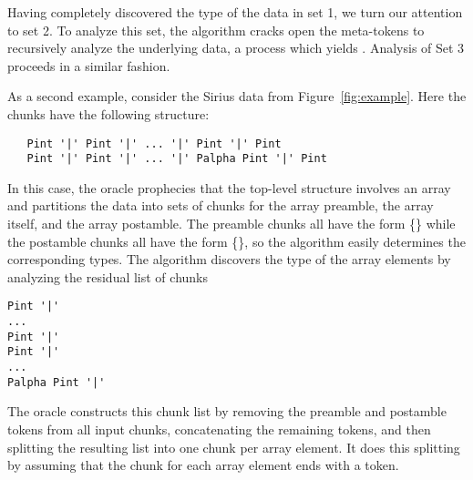 Having completely discovered the type of the data in set 1, we turn
our attention to set 2. 
To analyze this set, the algorithm cracks open the \cd{[*]} meta-tokens
to recursively analyze the underlying data, a process which yields 
. Analysis of Set 3 proceeds in a similar 
fashion.


As a second example, consider the Sirius data from Figure~\ref{fig:example}.
Here the chunks have the following structure:

{\small
\begin{verbatim}
   Pint '|' Pint '|' ... '|' Pint '|' Pint
   Pint '|' Pint '|' ... '|' Palpha Pint '|' Pint
\end{verbatim}
}%

\noindent
In this case, the oracle prophecies that the top-level structure involves
an array and partitions the data into sets of chunks for the
array preamble, the array itself, and the array postamble.  The
preamble chunks all have the form \{\} while the
postamble chunks all have the form \{\}, so the algorithm
easily determines the corresponding types. The algorithm discovers the
type of the array elements by analyzing the residual list of chunks

{\small
\begin{verbatim}
Pint '|' 
... 
Pint '|' 
Pint '|'
...
Palpha Pint '|'
\end{verbatim}
}%

\noindent
The oracle constructs this chunk list by removing the preamble and
postamble tokens from all input chunks, concatenating the
remaining tokens, and then splitting the resulting list into one chunk
per array element. It does this splitting by assuming that the chunk
for each array element ends with a  token.  

